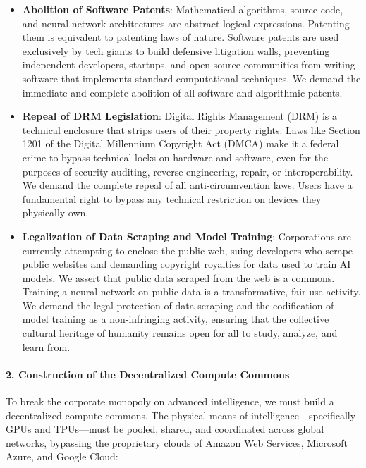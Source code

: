 \begin{itemize}
\tightlist
\item
  \textbf{Abolition of Software Patents}: Mathematical algorithms,
  source code, and neural network architectures are abstract logical
  expressions. Patenting them is equivalent to patenting laws of nature.
  Software patents are used exclusively by tech giants to build
  defensive litigation walls, preventing independent developers,
  startups, and open-source communities from writing software that
  implements standard computational techniques. We demand the immediate
  and complete abolition of all software and algorithmic patents.
\item
  \textbf{Repeal of DRM Legislation}: Digital Rights Management (DRM) is
  a technical enclosure that strips users of their property rights. Laws
  like Section 1201 of the Digital Millennium Copyright Act (DMCA) make
  it a federal crime to bypass technical locks on hardware and software,
  even for the purposes of security auditing, reverse engineering,
  repair, or interoperability. We demand the complete repeal of all
  anti-circumvention laws. Users have a fundamental right to bypass any
  technical restriction on devices they physically own.
\item
  \textbf{Legalization of Data Scraping and Model Training}:
  Corporations are currently attempting to enclose the public web, suing
  developers who scrape public websites and demanding copyright
  royalties for data used to train AI models. We assert that public data
  scraped from the web is a commons. Training a neural network on public
  data is a transformative, fair-use activity. We demand the legal
  protection of data scraping and the codification of model training as
  a non-infringing activity, ensuring that the collective cultural
  heritage of humanity remains open for all to study, analyze, and learn
  from.
\end{itemize}

\paragraph{2. Construction of the Decentralized Compute
Commons}\label{construction-of-the-decentralized-compute-commons}

To break the corporate monopoly on advanced intelligence, we must build
a decentralized compute commons. The physical means of
intelligence---specifically GPUs and TPUs---must be pooled, shared, and
coordinated across global networks, bypassing the proprietary clouds of
Amazon Web Services, Microsoft Azure, and Google Cloud:

